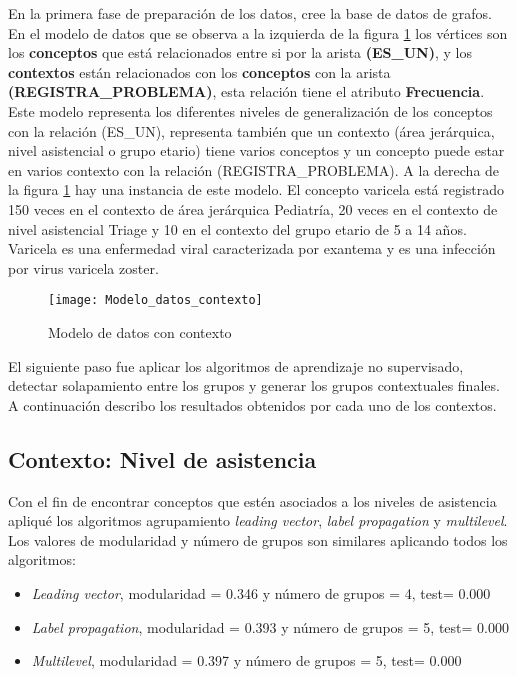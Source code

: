 En la primera fase de preparación de los datos, cree la base de datos de grafos. En el modelo de datos que se observa a la izquierda de la figura \ref{fig:ModeloDatosContexto} los vértices son los \textbf{conceptos} que está relacionados entre si por la arista \textbf{(ES\_UN)}, y los \textbf{contextos} están relacionados con los \textbf{conceptos} con la arista \textbf{(REGISTRA\_PROBLEMA)}, esta relación tiene el atributo \textbf{Frecuencia}. Este modelo representa los diferentes niveles de generalización de los conceptos con la relación (ES\_UN), representa también que un contexto (área jerárquica, nivel asistencial o grupo etario) tiene varios conceptos y un concepto puede estar en varios contexto con la relación (REGISTRA\_PROBLEMA). A la derecha de la figura  \ref{fig:ModeloDatosContexto} hay una instancia de este modelo. El concepto varicela está registrado 150 veces en el contexto de área jerárquica Pediatría, 20 veces en el contexto de nivel asistencial Triage y 10 en el contexto del grupo etario de 5 a 14 años. Varicela es una enfermedad viral caracterizada por exantema y es una infección por virus varicela zoster.

\begin{figure}[htbp]
\caption{Modelo de datos con contexto}
\label{fig:ModeloDatosContexto}
\centering
\texttt{[image: Modelo\_datos\_contexto]}
\end{figure}

El siguiente paso fue aplicar los algoritmos de aprendizaje no supervisado, detectar solapamiento entre los grupos y generar los grupos contextuales finales. A continuación describo los resultados obtenidos por cada uno de los contextos.

\subsection{Contexto: Nivel de asistencia}
Con el fin de encontrar conceptos que estén asociados a los niveles de asistencia apliqué los algoritmos agrupamiento \textit{leading vector}, \textit{label propagation} y \textit{multilevel}. Los valores de modularidad y número de grupos son similares aplicando todos los algoritmos:
\begin{itemize}
\item \textit{Leading vector}, modularidad = \num{0.346} y número de grupos = 4, test= 0.000
\item \textit{Label propagation}, modularidad = \num{0.393} y número de grupos = 5, test= 0.000
\item \textit{Multilevel}, modularidad = \num{0.397} y número de grupos = 5, test= 0.000
\end{itemize}

